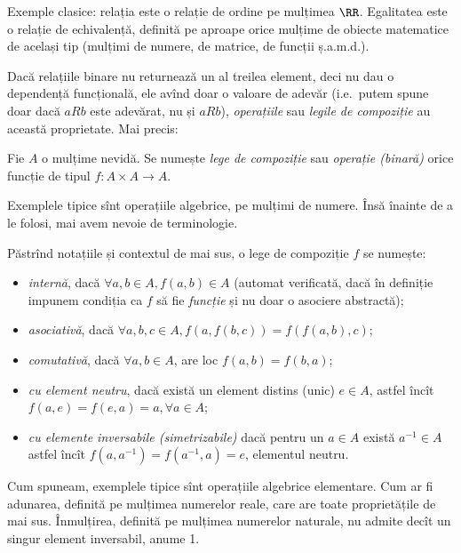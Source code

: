 Exemple clasice: relația \qq{$\leq$} este o relație de ordine pe mulțimea $\RR$. Egalitatea
este o relație de echivalență, definită pe aproape orice mulțime de obiecte matematice de
același tip (mulțimi de numere, de matrice, de funcții ș.a.m.d.).

\vspace{1cm}

Dacă relațiile binare nu returnează un al treilea element, deci nu dau o dependență funcțională,
ele avînd doar o valoare de adevăr (i.e.\ putem spune doar dacă $aRb$ este adevărat, nu și
 $a R b$), \emph{operațiile} sau \emph{legile de compoziție} au această proprietate.
Mai precis:

\begin{definition}\label{def:lege-comp}
  Fie $A$ o mulțime nevidă. Se numește \emph{lege de compoziție} sau \emph{operație (binară)} orice
  funcție de tipul $f : A \times A \to A$.
\end{definition}

Exemplele tipice sînt operațiile algebrice, pe mulțimi de numere. Însă înainte de a le folosi,
mai avem nevoie de terminologie.

Păstrînd notațiile și contextul de mai sus, o lege de compoziție $f$ se numește:
\begin{itemize}  
   
  \item \emph{internă}, dacă $\forall a, b \in A, f(a, b) \in A$ (automat verificată, dacă
    în definiție impunem condiția ca $f$ să fie \emph{funcție} și nu doar o asociere abstractă);
  \item \emph{asociativă}, dacă $\forall a, b, c \in A, f(a, f(b, c)) = f(f(a, b), c)$;
  \item \emph{comutativă}, dacă $\forall a, b \in A$, are loc $f(a, b) = f(b, a)$;
  \item \emph{cu element neutru}, dacă există un element distins (unic) $e \in A$, astfel încît
    $f(a, e) = f(e, a) = a, \forall a \in A$;
  \item \emph{cu elemente inversabile (simetrizabile)} dacă pentru un $a \in A$ există $a^{-1} \in A$
    astfel încît $f(a, a^{-1}) = f(a^{-1}, a) = e$, elementul neutru.
\end{itemize}

Cum spuneam, exemplele tipice sînt operațiile algebrice elementare. Cum ar fi adunarea, definită
pe mulțimea numerelor reale, care are toate proprietățile de mai sus. Înmulțirea, definită pe
mulțimea numerelor naturale, nu admite decît un singur element inversabil, anume 1.

